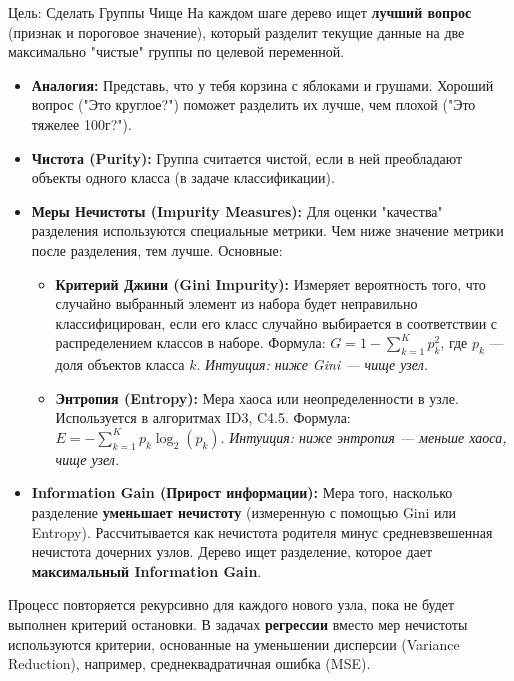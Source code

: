 \begin{myblock}{Цель: Сделать Группы Чище}
    На каждом шаге дерево ищет \textbf{лучший вопрос} (признак и пороговое значение), который разделит текущие данные на две максимально "чистые" группы по целевой переменной.
    \begin{itemize}
        \item \textbf{Аналогия:} Представь, что у тебя корзина с яблоками и грушами. Хороший вопрос ("Это круглое?") поможет разделить их лучше, чем плохой ("Это тяжелее 100г?").
        \item \textbf{Чистота (Purity):} Группа считается чистой, если в ней преобладают объекты одного класса (в задаче классификации).
        \item \textbf{Меры Нечистоты (Impurity Measures):} Для оценки "качества" разделения используются специальные метрики. Чем ниже значение метрики после разделения, тем лучше. Основные:
            \begin{itemize}
                \item \textbf{Критерий Джини (Gini Impurity):} Измеряет вероятность того, что случайно выбранный элемент из набора будет неправильно классифицирован, если его класс случайно выбирается в соответствии с распределением классов в наборе. Формула: $G = 1 - \sum_{k=1}^{K} p_k^2$, где $p_k$ — доля объектов класса $k$. \textit{Интуиция: ниже Gini — чище узел.}
                \item \textbf{Энтропия (Entropy):} Мера хаоса или неопределенности в узле. Используется в алгоритмах ID3, C4.5. Формула: $E = - \sum_{k=1}^{K} p_k \log_2(p_k)$. \textit{Интуиция: ниже энтропия — меньше хаоса, чище узел.}
            \end{itemize}
        \item \textbf{Information Gain (Прирост информации):} Мера того, насколько разделение \textbf{уменьшает нечистоту} (измеренную с помощью Gini или Entropy). Рассчитывается как нечистота родителя минус средневзвешенная нечистота дочерних узлов. Дерево ищет разделение, которое дает \textbf{максимальный Information Gain}.
    \end{itemize}
    Процесс повторяется рекурсивно для каждого нового узла, пока не будет выполнен критерий остановки. В задачах \textbf{регрессии} вместо мер нечистоты используются критерии, основанные на уменьшении дисперсии (Variance Reduction), например, среднеквадратичная ошибка (MSE).
\end{myblock}

